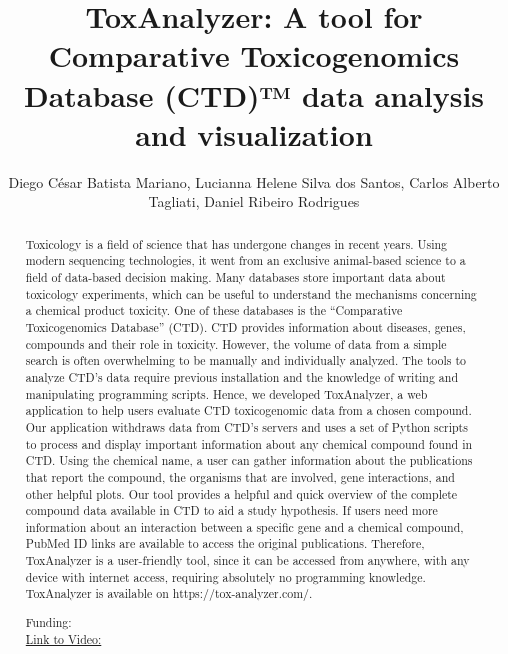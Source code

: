 \documentclass[twoside]{article}
\title{\vspace{-15mm}\fontsize{24pt}{10pt}\selectfont\textbf{ ToxAnalyzer: A tool for Comparative Toxicogenomics Database (CTD)™ data analysis and visualization }} %
\author{ Diego C\'esar Batista Mariano,  Lucianna Helene Silva dos Santos,  Carlos Alberto Tagliati,  Daniel Ribeiro Rodrigues }
\affil{ UNIVERSIDADE FEDERAL DE MINAS GERAIS,  IOC/Fiocruz }
\date{}
\begin{document}
  
  
  \maketitle %
  
  
  \thispagestyle{fancy} %
  
  
  \begin{abstract}
  Toxicology is a field of science that has undergone changes in recent years. Using modern sequencing technologies,  it went from an exclusive animal-based science to a field of data-based decision making. Many databases store important data about toxicology experiments,  which can be useful to understand the mechanisms concerning a chemical product toxicity. One of these databases is the “Comparative Toxicogenomics Database” (CTD). CTD provides information about diseases,  genes,  compounds and their role in toxicity. However,  the volume of data from a simple search is often overwhelming to be manually and individually analyzed. The tools to analyze CTD’s data require previous installation and the knowledge of writing and manipulating programming scripts. Hence,  we developed ToxAnalyzer,  a web application to help users evaluate CTD toxicogenomic data from a chosen compound. Our application withdraws data from CTD’s servers and uses a set of Python scripts to process and display important information about any chemical compound found in CTD. Using the chemical name,  a user can gather information about the publications that report the compound,  the organisms that are involved,  gene interactions,  and other helpful plots. Our tool provides a helpful and quick overview of the complete compound data available in CTD to aid a study hypothesis. If users need more information about an interaction between a specific gene and a chemical compound,  PubMed ID links are available to access the original publications. Therefore,  ToxAnalyzer is a user-friendly tool,  since it can be accessed from anywhere,  with any device with internet access,  requiring absolutely no programming knowledge. ToxAnalyzer is available on https://tox-analyzer.com/.
  
  Funding:   \\
  \href{http://ab3c.org.br/xpress_pres2020/xmxp2020-298211.html}{Link to Video:}

  \end{abstract}
   
  
\end{document}
